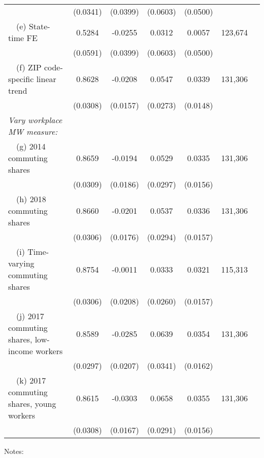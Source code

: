 \begin{table}
\begin{tabular}{@{}lcccccc@{}}
                                                             & (0.0341) & (0.0399) & (0.0603) & (0.0500) &      \\
        $\quad$(e) State-time FE                             &  0.5284  &  -0.0255  &  0.0312  &  0.0057  & 123,674 \\
                                                             & (0.0591) & (0.0399) & (0.0603) & (0.0500) &      \\
        $\quad$(f) ZIP code-specific linear trend            &  0.8628  &  -0.0208  &  0.0547  &  0.0339  & 131,306 \\
                                                             & (0.0308) & (0.0157) & (0.0273) & (0.0148) &      \\
        \textit{Vary workplace MW measure:}                  &       &       &       &       &      \\
        $\quad$(g) 2014 commuting shares                     &  0.8659  &  -0.0194  &  0.0529  &  0.0335  & 131,306 \\
                                                             & (0.0309) & (0.0186) & (0.0297) & (0.0156) &      \\
        $\quad$(h) 2018 commuting shares                     &  0.8660  &  -0.0201  &  0.0537  &  0.0336  & 131,306 \\
                                                             & (0.0306) & (0.0176) & (0.0294) & (0.0157) &      \\
        $\quad$(i) Time-varying commuting shares             &  0.8754  &  -0.0011  &  0.0333  &  0.0321  & 115,313 \\
                                                             & (0.0306) & (0.0208) & (0.0260) & (0.0157) &      \\
        $\quad$(j) 2017 commuting shares, low-income workers &  0.8589  &  -0.0285  &  0.0639  &  0.0354  & 131,306 \\
                                                             & (0.0297) & (0.0207) & (0.0341) & (0.0162) &      \\
        $\quad$(k) 2017 commuting shares, young workers      &  0.8615  &  -0.0303  &  0.0658  &  0.0355  & 131,306 \\
                                                             & (0.0308) & (0.0167) & (0.0291) & (0.0156) &      \\ \bottomrule
    \end{tabular}

    \begin{minipage}{.95\textwidth} \footnotesize
        \vspace{2mm}
        Notes: 
        
    \end{minipage}
\end{table}
